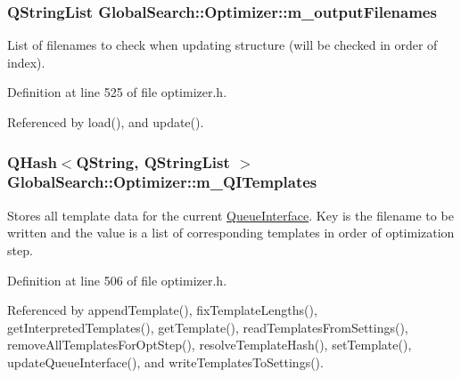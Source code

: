 \hypertarget{classGlobalSearch_1_1Optimizer_a28a8bf74bf7bdf00d453890796574c7d}{}
\subsubsection[{m\+\_\+output\+Filenames}]{\setlength{\rightskip}{0pt plus 5cm}Q\+String\+List Global\+Search\+::\+Optimizer\+::m\+\_\+output\+Filenames\hspace{0.3cm}{\ttfamily [protected]}}\label{classGlobalSearch_1_1Optimizer_a28a8bf74bf7bdf00d453890796574c7d}
List of filenames to check when updating structure (will be checked in order of index). 

Definition at line 525 of file optimizer.\+h.



Referenced by load(), and update().

\hypertarget{classGlobalSearch_1_1Optimizer_ac23d5114bf09b816666351868d49d1f8}{}
\subsubsection[{m\+\_\+\+Q\+I\+Templates}]{\setlength{\rightskip}{0pt plus 5cm}Q\+Hash$<$Q\+String, Q\+String\+List $>$ Global\+Search\+::\+Optimizer\+::m\+\_\+\+Q\+I\+Templates\hspace{0.3cm}{\ttfamily [protected]}}\label{classGlobalSearch_1_1Optimizer_ac23d5114bf09b816666351868d49d1f8}
Stores all template data for the current \hyperlink{classGlobalSearch_1_1QueueInterface}{Queue\+Interface}. Key is the filename to be written and the value is a list of corresponding templates in order of optimization step. 

Definition at line 506 of file optimizer.\+h.



Referenced by append\+Template(), fix\+Template\+Lengths(), get\+Interpreted\+Templates(), get\+Template(), read\+Templates\+From\+Settings(), remove\+All\+Templates\+For\+Opt\+Step(), resolve\+Template\+Hash(), set\+Template(), update\+Queue\+Interface(), and write\+Templates\+To\+Settings().

